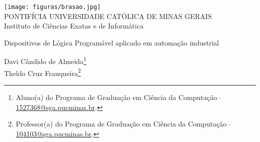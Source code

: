 \documentclass[a4paper,12pt]{article}
\makeatletter
\newcommand{\monog}{Dispositivos de Lógica Programável aplicado em automação industrial
}
\newcommand{\AutorA}{Davi Cândido de Almeida}
\newcommand{\funcaoA}{}
\newcommand{\emailA}{\href{Davi Cândido de Almeida: 104103@sga.pucminas.br}{1527368@sga.pucminas.br}}
\newcommand{\cursA}{Aluno(a) do Programa de Graduação em Ciência da Computação}
\newcommand{\AutorB}{Theldo Cruz Franqueira}
\newcommand{\funcaoB}{}
\newcommand{\emailB}{\href{Theldo Cruz Franqueira: 104103@sga.pucminas.br}{104103@sga.pucminas.br}}
\newcommand{\cursB}{Professor(a) do Programa de Graduação em Ciência da Computação}
\newcommand{\keyword}[1]{\textsf{#1}}
\makeatother
\begin{document}

\begin{center}
\texttt{[image: figuras/brasao.jpg]} \\
PONTIFÍCIA UNIVERSIDADE CATÓLICA DE MINAS GERAIS \\
Instituto de Ciências Exatas e de Informática


\end{center}

 \vspace{0cm} {
 \singlespacing \Large{\monog {} \\ }
 }

\vspace{1.0cm}

\begin{flushright}
\singlespacing 
\normalsize{\AutorA \footnote{\funcaoA \cursA \,-- \emailA . }} \\
\normalsize{\AutorB \footnote{\funcaoB \cursB \,-- \emailB . }} \\
\end{flushright}
\thispagestyle{empty}

\vspace{1.0cm}

\begin{abstract}
\noindent
O presente artigo explora a utilização de Dispositivos Lógicos Programáveis Complexos (CPLDs) na automação industrial, destacando seu papel na otimização de processos e na redução de custos de produção. Com o crescente avanço das tecnologias eletrônicas, os CPLDs surgem como uma alternativa versátil aos Controladores Lógicos Programáveis tradicionais, oferecendo interfaces amigáveis e a capacidade de reconfiguração. O estudos analisados se propõe a analisar e descrever conceitos da literatura acadêmica sobre CPLDs, visando entender suas aplicações industriais, benefícios e terminologias associadas. O artigo aborda a evolução dos circuitos digitais, destacando a importância de tecnologias como ASICs, ASSPs e FPGAs, PROMs, PLAs e PALs. Os CPLDs são apresentados como uma solução flexível e eficiente, capaz de atender às necessidades de inovação tecnológica em diversos setores, permitindo a adaptação rápida a novas demandas. Assim, o presente trabalho busca a construção de uma base sólida de conhecimento sobre o funcionamento e as aplicações dos CPLDs, ressaltando sua relevância na automação industrial moderna.
\\\textbf{\keyword{Palavras-chave:}} CPLDs; FPGA; PROM; PLA; PAL.
\end{abstract}
\end{document}
